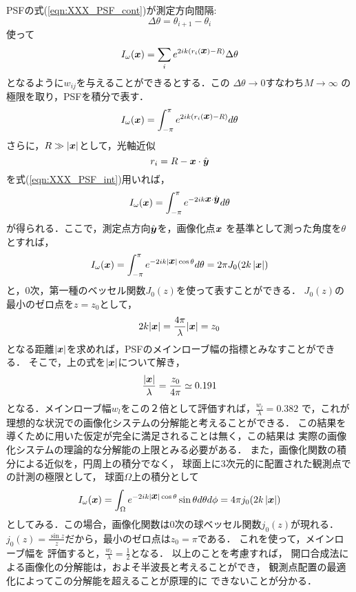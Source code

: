 PSFの式(\ref{eqn:XXX_PSF_cont})が測定方向間隔:
\begin{equation}
	\Delta \theta = \theta_{i+1}-\theta_i
	\label{eqn:}
\end{equation}
使って
\begin{equation}
	I_\omega(\mbox{\boldmath $x$})
		=
	\sum_{i} 
	e^{
	2ik
	\left(
		r_i(\mbox{\boldmath $x$})-R
	\right)
	}
	\Delta \theta
	\label{eqn:XXX_PSF_dth}
\end{equation}
となるように$w_{ij}$を与えることができるとする．この
$\Delta \theta \rightarrow 0$すなわち$M\rightarrow \infty$
の極限を取り，PSFを積分で表す．
\begin{equation}
	I_\omega(\mbox{\boldmath $x$})
		=
	\int_{-\pi}^{\pi}
	e^{
	2ik
	\left(
		r_i(\mbox{\boldmath $x$})-R
	\right)
	}
	d\theta
	\label{eqn:XXX_PSF_int}
\end{equation}
さらに，$R\gg |\mbox{\boldmath $x$}|$として，光軸近似
\begin{equation}
	r_i=R-\mbox{\boldmath $x$}\cdot \hat{\mbox{\boldmath $y$}}
	\label{eqn:}
\end{equation}
を式(\ref{eqn:XXX_PSF_int})用いれば，
\begin{equation}
	I_\omega(\mbox{\boldmath $x$})
		=
	\int_{-\pi}^{\pi}
	e^{
	-2ik \mbox{\boldmath $x$}\cdot \hat{\mbox{\boldmath $y$}}
	}
	d\theta
	\label{eqn:XXX_PSF_int2}
\end{equation}
が得られる．ここで，測定点方向$\hat{\mbox{\boldmath $y$}}$を，画像化点$\mbox{\boldmath $x$}$
を基準として測った角度を$\theta$とすれば，
\begin{equation}
	I_\omega(\mbox{\boldmath $x$})
		=
	\int_{-\pi}^{\pi}
	e^{
	-2ik |\mbox{\boldmath $x$}| \cos \theta
	}
	d\theta
	=
	2\pi J_0(2k\left|\mbox{\boldmath $x$}\right|)
	\label{eqn:XXX_PSF_J0}
\end{equation}
と，0次，第一種のベッセル関数$J_0(z)$を使って表すことができる．
$J_0(z)$の最小のゼロ点を$z=z_0$として，
\begin{equation}
	2k|\mbox{\boldmath $x$}|=\frac{4\pi}{\lambda}|\mbox{\boldmath $x$}|=z_0
	\label{eqn:}
\end{equation}
となる距離$|\mbox{\boldmath $x$}|$を求めれば，PSFのメインローブ幅の指標とみなすことができる．
そこで，上の式を$|\mbox{\boldmath $x$}|$について解き，
\begin{equation}
	\frac{|\mbox{\boldmath $x$}|}{\lambda}=\frac{z_0}{4\pi}\simeq 0.191
	\label{eqn:}
\end{equation}
となる．メインローブ幅$w_l$をこの２倍として評価すれば，$\frac{w_l}{\lambda}=0.382$
で，これが理想的な状況での画像化システムの分解能と考えることができる．
この結果を導くために用いた仮定が完全に満足されることは無く，この結果は
実際の画像化システムの理論的な分解能の上限とみる必要がある．
また，画像化関数の積分による近似を，円周上の積分でなく，
球面上に3次元的に配置された観測点での計測の極限として，
球面$\Omega$上の積分として
\begin{equation}
	I_\omega(\mbox{\boldmath $x$})
		=
	\int_\Omega
	e^{
	-2ik |\mbox{\boldmath $x$}| \cos \theta
	}
	\sin\theta
	d\theta d\phi
	=
	4\pi j_0(2k\left|\mbox{\boldmath $x$}\right|)
	\label{eqn:XXX_PSF_J0}
\end{equation}
としてみる．この場合，画像化関数は0次の球ベッセル関数$j_0(z)$が現れる．
$j_0(z)=\frac{\sin z}{z}$だから，最小のゼロ点は$z_0=\pi$である．
これを使って，メインローブ幅を
評価すると，$\frac{w_l}{\lambda}=\frac{1}{2}$となる．
以上のことを考慮すれば，
開口合成法による画像化の分解能は，およそ半波長と考えることができ，
観測点配置の最適化によってこの分解能を超えることが原理的に
できないことが分かる．
